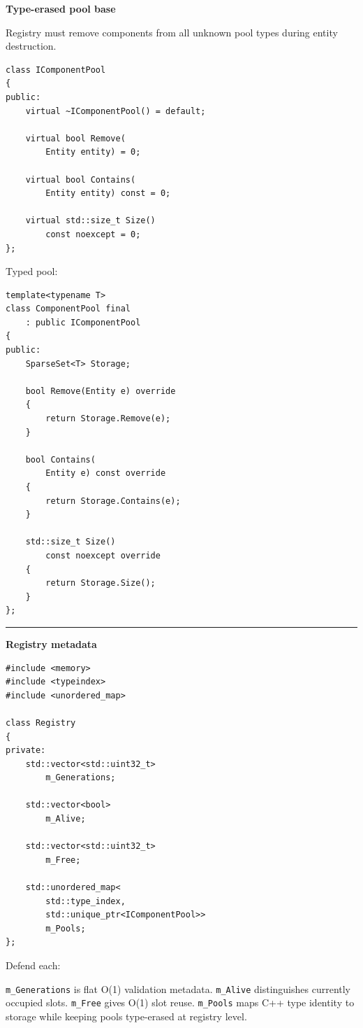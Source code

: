 \textbf{Type-erased pool base}

Registry must remove components from all unknown pool types during entity destruction.

\begin{verbatim}
class IComponentPool
{
public:
    virtual ~IComponentPool() = default;

    virtual bool Remove(
        Entity entity) = 0;

    virtual bool Contains(
        Entity entity) const = 0;

    virtual std::size_t Size()
        const noexcept = 0;
};
\end{verbatim}

Typed pool:

\begin{verbatim}
template<typename T>
class ComponentPool final
    : public IComponentPool
{
public:
    SparseSet<T> Storage;

    bool Remove(Entity e) override
    {
        return Storage.Remove(e);
    }

    bool Contains(
        Entity e) const override
    {
        return Storage.Contains(e);
    }

    std::size_t Size()
        const noexcept override
    {
        return Storage.Size();
    }
};
\end{verbatim}

\begin{center}\rule{0.5\linewidth}{0.5pt}\end{center}

\textbf{Registry metadata}

\begin{verbatim}
#include <memory>
#include <typeindex>
#include <unordered_map>

class Registry
{
private:
    std::vector<std::uint32_t>
        m_Generations;

    std::vector<bool>
        m_Alive;

    std::vector<std::uint32_t>
        m_Free;

    std::unordered_map<
        std::type_index,
        std::unique_ptr<IComponentPool>>
        m_Pools;
};
\end{verbatim}

Defend each:

\texttt{m\_Generations} is flat O(1) validation metadata. \texttt{m\_Alive} distinguishes currently occupied slots. \texttt{m\_Free} gives O(1) slot reuse. \texttt{m\_Pools} maps C++ type identity to storage while keeping pools type-erased at registry level.

